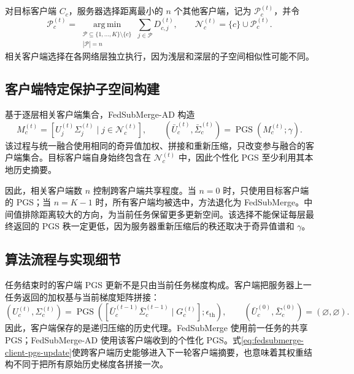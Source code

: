 对目标客户端 $C_c$，服务器选择距离最小的 $n$ 个其他客户端，记为 $\mathcal{P}_c^{(t)}$，并令
\begin{equation}
\mathcal{P}_c^{(t)}
=
\operatorname*{arg\,min}_{
\substack{\mathcal{P}\subseteq\{1,\ldots,K\}\setminus\{c\}\\|\mathcal{P}|=n}}
\sum_{j\in\mathcal{P}}D_{c,j}^{(t)},
\qquad
\mathcal{N}_c^{(t)}=\{c\}\cup\mathcal{P}_c^{(t)}.
\label{eq:fedsubmerge-neighbor-set}
\end{equation}
相关客户端选择在各网络层独立执行，因为浅层和深层的子空间相似性可能不同。

\subsection{客户端特定保护子空间构建}
\label{subsec:fedsubmerge-personalized-subspace}

基于逐层相关客户端集合，FedSubMerge-AD 构造
\begin{equation}
M_c^{(t)}
=
\left[
U_j^{(t)}\Sigma_j^{(t)}\mid j\in\mathcal{N}_c^{(t)}
\right],
\qquad
(\bar U_c^{(t)},\bar\Sigma_c^{(t)})
=
\operatorname{PGS}\!\left(M_c^{(t)};\gamma\right).
\label{eq:fedsubmerge-personalized-merge}
\end{equation}
该过程与统一融合使用相同的奇异值加权、拼接和重新压缩，只改变参与融合的客户端集合。目标客户端自身始终包含在 $\mathcal{N}_c^{(t)}$ 中，因此个性化 PGS 至少利用其本地历史摘要。

因此，相关客户端数 $n$ 控制跨客户端共享程度。当 $n=0$ 时，只使用目标客户端的 PGS；当 $n=K-1$ 时，所有客户端均被选中，方法退化为 FedSubMerge。中间值排除距离较大的方向，为当前任务保留更多更新空间。该选择不能保证每层最终返回的 PGS 秩一定更低，因为服务器重新压缩后的秩还取决于奇异值谱和 $\gamma$。

\subsection{算法流程与实现细节}
\label{subsec:fedsubmerge-algorithm}

任务结束时的客户端 PGS 更新不是只由当前任务梯度构成。客户端把服务器上一任务返回的加权基与当前梯度矩阵拼接：
\begin{equation}
(U_c^{(t)},\Sigma_c^{(t)})
=
\operatorname{PGS}\!\left(
\left[
\bar U_c^{(t-1)}\bar\Sigma_c^{(t-1)}
\mid
G_c^{(t)}
\right];
\epsilon_{\mathrm{th}}
\right),
\qquad
(\bar U_c^{(0)},\bar\Sigma_c^{(0)})=(\varnothing,\varnothing).
\label{eq:fedsubmerge-client-pgs-update}
\end{equation}
因此，客户端保存的是递归压缩的历史代理。FedSubMerge 使用前一任务的共享 PGS；FedSubMerge-AD 使用该客户端收到的个性化 PGS。式\eqref{eq:fedsubmerge-client-pgs-update}使跨客户端历史能够进入下一轮客户端摘要，也意味着其权重结构不同于把所有原始历史梯度各拼接一次。

